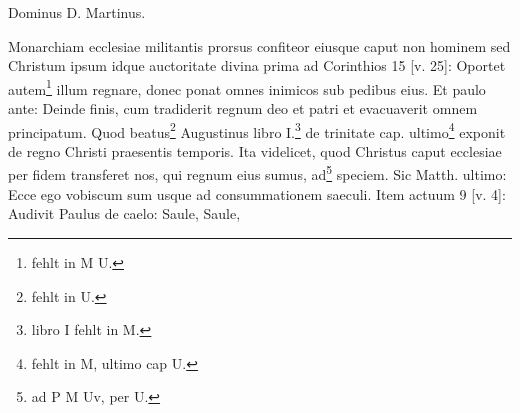Dominus D. Martinus.

Monarchiam ecclesiae militantis prorsus confiteor eiusque caput non hominem sed Christum ipsum idque auctoritate divina prima ad Corinthios 15 [v. 25]: Oportet autem\footnote{fehlt in M U.} illum regnare, donec ponat omnes inimicos sub pedibus eius. Et paulo ante: Deinde finis, cum tradiderit regnum deo et patri et evacuaverit omnem principatum. Quod beatus\footnote{fehlt in U.} Augustinus libro I.\footnote{libro I fehlt in M.} de trinitate cap. ultimo\footnote{fehlt in M, ultimo cap U.} exponit de regno Christi praesentis temporis. Ita videlicet, quod Christus caput ecclesiae per fidem transferet nos, qui regnum eius sumus, ad\footnote{ad P M Uv, per U.} speciem. Sic Matth. ultimo: Ecce ego vobiscum sum usque ad consummationem saeculi. Item actuum 9 [v. 4]: Audivit Paulus de caelo: Saule, Saule,
